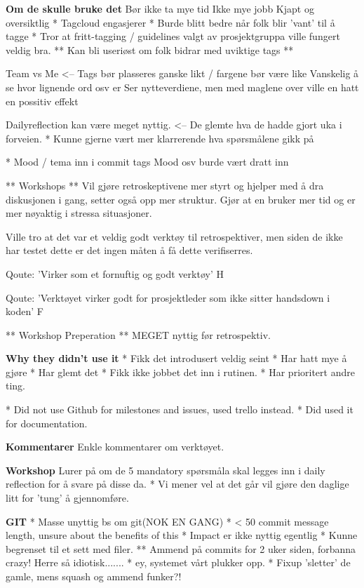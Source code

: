 
\textbf{Om de skulle bruke det}
Bør ikke ta mye tid
Ikke mye jobb
Kjapt og oversiktlig
 * Tagcloud engasjerer
 * Burde blitt bedre når folk blir 'vant' til å tagge
 * Tror at fritt-tagging / guidelines valgt av prosjektgruppa ville fungert veldig bra.
 ** Kan bli useriøst om folk bidrar med uviktige tags ** 

 Team vs Me <-- Tags bør plasseres ganske likt / fargene bør være like
				Vanskelig å se hvor lignende ord osv er
				Ser nytteverdiene, men med maglene over ville en hatt en possitiv effekt

Dailyreflection kan være meget nyttig. <-- De glemte hva de hadde gjort uka i forveien.
	* Kunne gjerne vært mer klarrerende hva spørsmålene gikk på


 * Mood / tema inn i commit tags
 Mood osv burde vært dratt inn

 ** Workshops **
 Vil gjøre retroskeptivene mer styrt og hjelper med å dra diskusjonen i gang, setter også opp mer struktur.
 Gjør at en bruker mer tid og er mer nøyaktig i stressa situasjoner.

 Ville tro at det var et veldig godt verktøy til retrospektiver, men siden de ikke har testet dette er det ingen måten å få dette verifiserres.
 
 Qoute: 'Virker som et fornuftig og godt verktøy' H

 Qoute: 'Verktøyet virker godt for prosjektleder som ikke sitter handsdown i koden' F

** Workshop Preperation **
 MEGET nyttig før retrospektiv.

\textbf{Why they didn't use it}
* Fikk det introdusert veldig seint
	* Har hatt mye å gjøre
	* Har glemt det
* Fikk ikke jobbet det inn i rutinen.
* Har prioritert andre ting.


* Did not use Github for milestones and issues, used trello instead.
	* Did used it for documentation.

\textbf{Kommentarer}
Enkle kommentarer om verktøyet.

\textbf{Workshop}
Lurer på om de 5 mandatory spørsmåla skal legges inn i daily reflection for å svare på disse da.
	* Vi mener vel at det går vil gjøre den daglige litt for 'tung' å gjennomføre.


\textbf{GIT}
* Masse unyttig bs om git(NOK EN GANG)
* < 50 commit message length, unsure about the benefits of this
* Impact er ikke nyttig egentlig
	* Kunne begrenset til et sett med filer.
	** Ammend på commits for 2 uker siden, forbanna crazy! Herre så idiotisk.......
		* ey, systemet vårt plukker opp.
* Fixup 'sletter' de gamle, mens squash og ammend funker?!

